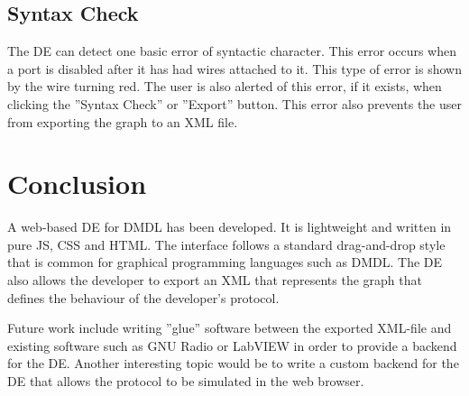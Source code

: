 \documentclass[journal,comsoc]{IEEEtran}
\begin{document}
\subsection{Syntax Check}
The DE can detect one basic error of syntactic character. This error occurs when a port is
disabled after it has had wires attached to it. This type of error is shown by the wire turning
red. The user is also alerted of this error, if it exists, when clicking the ''Syntax Check''
or ''Export'' button. This error also prevents the user from exporting the graph to an XML file.


\section{Conclusion}
A web-based DE for DMDL has been developed. It is lightweight and written in pure JS, CSS and HTML.
The interface follows a standard drag-and-drop style that is common for graphical programming
languages such as DMDL. The DE also allows the developer to export an XML that represents the graph
that defines the behaviour of the developer's protocol.

Future work include writing ''glue'' software between the exported XML-file and existing software
such as GNU Radio or LabVIEW in order to provide a backend for the DE. Another interesting topic
would be to write a custom backend for the DE that allows the protocol to be simulated in the 
web browser.

 

%
%
\end{document}

